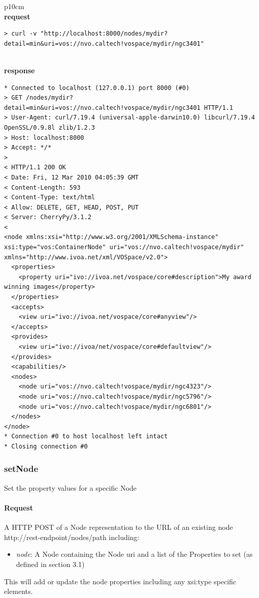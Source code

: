 \documentclass[11pt,a4paper]{ivoa}
\begin{document}
\begin{tabular}{ p{10cm} }
\\
\textbf{request} \\
\begin{lstlisting}
> curl -v "http://localhost:8000/nodes/mydir?detail=min&uri=vos://nvo.caltech!vospace/mydir/ngc3401"
\end{lstlisting} \\
\textbf{response} \\
\begin{lstlisting}
* Connected to localhost (127.0.0.1) port 8000 (#0)
> GET /nodes/mydir?detail=min&uri=vos://nvo.caltech!vospace/mydir/ngc3401 HTTP/1.1
> User-Agent: curl/7.19.4 (universal-apple-darwin10.0) libcurl/7.19.4 OpenSSL/0.9.8l zlib/1.2.3
> Host: localhost:8000
> Accept: */*
> 
< HTTP/1.1 200 OK
< Date: Fri, 12 Mar 2010 04:05:39 GMT
< Content-Length: 593
< Content-Type: text/html
< Allow: DELETE, GET, HEAD, POST, PUT
< Server: CherryPy/3.1.2
< 
<node xmlns:xsi="http://www.w3.org/2001/XMLSchema-instance"
xsi:type="vos:ContainerNode" uri="vos://nvo.caltech!vospace/mydir"
xmlns="http://www.ivoa.net/xml/VOSpace/v2.0">
  <properties>
    <property uri="ivo://ivoa.net/vospace/core#description">My award winning images</property>
  </properties>
  <accepts>
    <view uri="ivo://ivoa.net/vospace/core#anyview"/>
  </accepts>
  <provides>
    <view uri="ivo://ivoa/net/vospace/core#defaultview"/>
  </provides>
  <capabilities/>
  <nodes>
    <node uri="vos://nvo.caltech!vospace/mydir/ngc4323"/>
    <node uri="vos://nvo.caltech!vospace/mydir/ngc5796"/>
    <node uri="vos://nvo.caltech!vospace/mydir/ngc6801"/>
  </nodes>
</node>
* Connection #0 to host localhost left intact
* Closing connection #0
\end{lstlisting}
\end{tabular}

\subsubsection{setNode}
Set the property values for a specific Node

\paragraph{Request}
A HTTP POST of a Node representation to the URL of an existing node http://rest-endpoint/nodes/path including:
\begin{itemize}
    \item \emph{node}: A Node containing the Node uri and a list of the Properties to set (as defined in section 3.1)
\end{itemize}
This will add or update the node properties including any xsi:type specific elements.
\end{document}
